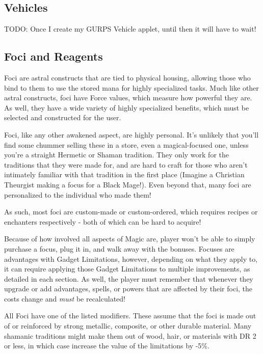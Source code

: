 \begin{multicols*}{2}
	\subsection{Vehicles}
	
	TODO: Once I create my GURPS Vehicle applet, until then it will have to wait!
	
	\subsection{Foci and Reagents}
	
	Foci are astral constructs that are tied to physical housing, allowing those who bind to them to use the stored mana for highly specialized tasks. Much like other astral constructs, foci have Force values, which measure how powerful they are. As well, they have a wide variety of highly specialized benefits, which must be selected and constructed for the user.
	
	Foci, like any other awakened aspect, are highly personal. It's unlikely that you'll find some chummer selling these in a store, even a magical-focused one, unless you're a straight Hermetic or Shaman tradition. They only work for the traditions that they were made for, and are hard to craft for those who aren't intimately familiar with that tradition in the first place (Imagine a Christian Theurgist making a focus for a Black Mage!). Even beyond that, many foci are personalized to the individual who made them!
	
	As such, most foci are custom-made or custom-ordered, which requires recipes or enchanters respectively - both of which can be hard to acquire!
	
	Because of how involved all aspects of Magic are, player won't be able to simply purchase a focus, plug it in, and walk away with the bonuses. Focuses are advantages with Gadget Limitations, however, depending on what they apply to, it can require applying those Gadget Limitations to multiple improvements, as detailed in each section. As well, the player must remember that whenever they upgrade or add advantages, spells, or powers that are affected by their foci, the costs change and \textit{must} be recalculated!
	
	All Foci have one of the listed modifiers. These assume that the foci is made out of or reinforced by strong metallic, composite, or other durable material. Many shamanic traditions might make them out of wood, hair, or materials with DR 2 or less, in which case increase the value of the limitations by -5\%.
	

\end{multicols*}
